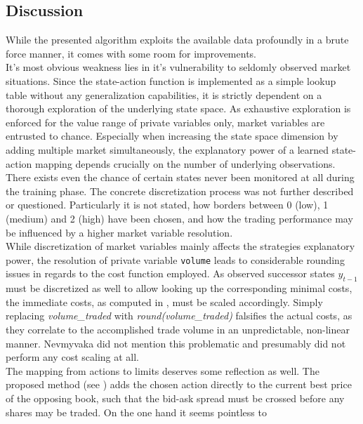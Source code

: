 \subsection{Discussion}
While the presented algorithm exploits the available data profoundly in a brute force manner, it comes with some room for improvements.\\

It's most obvious weakness lies in it's vulnerability to seldomly observed market situations. Since the state-action function is implemented as a simple lookup table without any generalization capabilities, it is strictly dependent on a thorough exploration of the underlying state space. As exhaustive exploration is enforced for the value range of private variables only, market variables are entrusted to chance. Especially when increasing the state space dimension by adding multiple market simultaneously, the explanatory power of a learned state-action mapping depends crucially on the number of underlying observations. There exists even the chance of certain states never been monitored at all during the training phase. The concrete discretization process was not further described or questioned. Particularly it is not stated, how borders between 0 (low), 1 (medium) and 2 (high) have been chosen, and how the trading performance may be influenced by a higher market variable resolution.\\

While discretization of market variables mainly affects the strategies explanatory power, the resolution of private variable \lstinline!volume! leads to considerable rounding issues in regards to the cost function employed. As observed successor states $y_{t-1}$ must be discretized as well to allow looking up the corresponding minimal costs, the immediate costs, as computed in , must be scaled accordingly. Simply replacing \emph{volume\_traded} with \emph{round(volume\_traded)} falsifies the actual costs, as they correlate to the accomplished trade volume in an  unpredictable, non-linear manner. Nevmyvaka \etal \Cite{Nevmyvaka:2006} did not mention this problematic and presumably did not perform any cost scaling at all.\\

The mapping from actions to limits deserves some reflection as well. The proposed method (see ) adds the chosen action directly to the current best price of the opposing book, such that the bid-ask spread must be crossed before any shares may be traded. On the one hand it seems pointless to 


